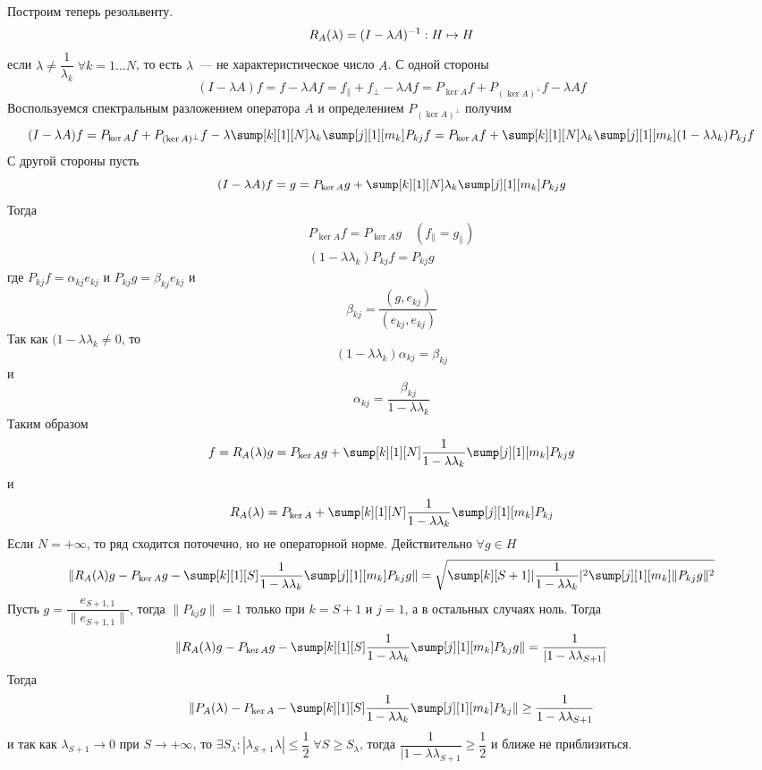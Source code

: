 \documentclass[14pt]{extarticle}
\begin{document}
Построим теперь резольвенту.
$$
R_A(\lambda) = (I - \lambda A)^{-1} : H \mapsto H
$$
если $\lambda \ne \dfrac{1}{\lambda_k}\; \forall k = 1 \dots N$, то есть
$\lambda$~--- не характеристическое число $A$.
С одной стороны
$$
(I - \lambda A) f = f - \lambda A f = f_\parallel + f_\perp - \lambda A f =
P_{\ker A}f + P_{(\ker A)^\perp}f - \lambda A f
$$
Воспользуемся спектральным разложением оператора $A$ и определением
$P_{(\ker A)^\perp}$ получим
$$
(I - \lambda A) f = P_{\ker A}f + P_{(\ker A)^\perp}f - \lambda
\sump[k][1][N] \lambda_k\sump[j][1][m_k] P_{kj} f = 
P_{\ker A}f + \sump[k][1][N] \lambda_k\sump[j][1][m_k] (1 - \lambda \lambda_k)
P_{kj} f
$$
С другой стороны пусть
$$
(I - \lambda A)f = g = P_{\ker A}g + \sump[k][1][N] \lambda_k\sump[j][1][m_k] P_{kj} g
$$
Тогда
\begin{gather*}
    P_{\ker A} f = P_{\ker A}g\quad (f_\parallel = g_\parallel)\\
    (1 - \lambda \lambda_k)P_{kj}f = P_{kj}g
\end{gather*} 
где $P_{kj}f = \alpha_{kj} e_{kj}$ и $P_{kj}g = \beta_{kj}e_{kj}$  и
$$
\beta_{kj} = \dfrac{(g, e_{kj})}{(e_{kj}, e_{kj})}
$$
Так как $(1 - \lambda \lambda_k \neq 0$, то
$$
(1 - \lambda \lambda_k)\alpha_{kj} = \beta_{kj}
$$
и
$$
\alpha_{kj} = \dfrac{\beta_{kj}}{1 - \lambda \lambda_k}
$$
Таким образом
$$
f = R_A(\lambda)g = P_{\ker A}g + \sump[k][1][N]\dfrac{1}{1 - \lambda \lambda_k}
\sump[j][1][m_k]P_{kj}g
$$
и
$$
R_A(\lambda) = P_{\ker A} + \sump[k][1][N]\dfrac{1}{1 - \lambda \lambda_k}
\sump[j][1][m_k]P_{kj}
$$
Если $N = +\infty$, то ряд сходится поточечно, но не операторной норме.
Действительно $\forall g \in H$
$$
\|R_A(\lambda)g - P_{\ker A}g - \sump[k][1][S]\dfrac{1}{1 - \lambda\lambda_k}\sump[j][1][m_k]
P_{kj}g\| =
\sqrt{\sump[k][S +1]|\dfrac{1}{1 - \lambda\lambda_k}|^2\sump[j][1][m_k]\|P_{kj}g\|^2}
$$
Пусть $g = \dfrac{e_{S + 1,1}}{\|e_{S+1,1}\|}$, тогда $\|P_{kj}g\| = 1$ только при $k = S + 1$
и $j = 1$, а в остальных случаях ноль.
Тогда
$$
\|R_A(\lambda)g - P_{\ker A}g - \sump[k][1][S]\dfrac{1}{1 - \lambda\lambda_k}\sump[j][1][m_k]
P_{kj}g\| = \dfrac{1}{|1 - \lambda \lambda_{S + 1}|}
$$
Тогда
$$
\|P_A(\lambda) - P_{\ker A} - \sump[k][1][S]\dfrac{1}{1 - \lambda\lambda_k}\sump[j][1][m_k]
P_{kj}\| \ge \dfrac{1}{1 - \lambda\lambda_{S + 1}}
$$
и так как $\lambda_{S + 1} \to 0$ при $S \to +\infty$, то $\exists S_\lambda\colon 
|\lambda_{S + 1}\lambda| \le \dfrac{1}{2}\;\forall S \ge S_\lambda$, тогда $\dfrac{1}{|1 - 
\lambda \lambda_{S + 1}} \ge \dfrac{1}{2}$ и ближе не приблизиться.
\end{document}
